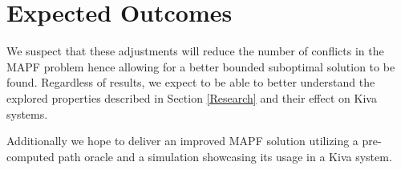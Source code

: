 \documentclass[a4paper,11pt]{article}
\begin{document}
\section{Expected Outcomes}

We suspect that these adjustments will reduce the number of conflicts in the MAPF problem hence allowing for a better bounded suboptimal solution to be found. Regardless of results, we expect to be able to better understand the explored properties described in Section \ref{Research} and their effect on Kiva systems.

Additionally we hope to deliver an improved MAPF solution utilizing a pre-computed path oracle and a simulation showcasing its usage in a Kiva system.






\end{document}
